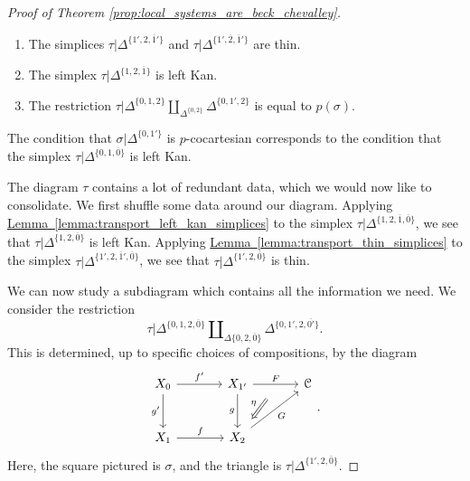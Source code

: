\documentclass[main.tex]{subfiles}
\begin{document}
\begin{proof}[Proof of Theorem \ref{prop:local_systems_are_beck_chevalley}]
\begin{enumerate}
    \item The simplices $\tau|\Delta^{\{1',2,\overline{1}'\}}$ and $\tau|\Delta^{\{1',\overline{2},\overline{1}'\}}$ are thin.

    \item The simplex $\tau|\Delta^{\{1,2,\overline{1}\}}$ is left Kan.

    \item The restriction $\tau|\Delta^{\{0,1,2\}} \amalg_{\Delta^{\{0,2\}}}\Delta^{\{0,1',2\}}$ is equal to $p(\sigma)$.
  \end{enumerate}
  The condition that $\sigma|\Delta^{\{0, 1'\}}$ is $p$-cocartesian corresponds to the condition that the simplex $\tau|\Delta^{\{0,1,\overline{0}\}}$ is left Kan.

  The diagram $\tau$ contains a lot of redundant data, which we would now like to consolidate. We first shuffle some data around our diagram. Applying \hyperref[lemma:transport_left_kan_simplices]{Lemma~\ref*{lemma:transport_left_kan_simplices}} to the simplex $\tau|\Delta^{\{1,2,\overline{1}, \overline{0}\}}$, we see that $\tau|\Delta^{\{1,2,\overline{0}\}}$ is left Kan. Applying \hyperref[lemma:transport_thin_simplices]{Lemma~\ref*{lemma:transport_thin_simplices}} to the simplex $\tau|\Delta^{\{1',2, \overline{1}', \overline{0}\}}$, we see that $\tau|\Delta^{\{1',2, \overline{0}\}}$ is thin.

  We can now study a subdiagram which contains all the information we need. We consider the restriction
  \begin{equation*}
    \tau|\Delta^{\{0,1,2,\overline{0}\}} \amalg_{\Delta\{0,2,\overline{0}\}} \Delta^{\{0,1',2,\overline{0'}\}}.
  \end{equation*}
  This is determined, up to specific choices of compositions, by the diagram
  \begin{equation*}
    \begin{tikzcd}[row sep=large, column sep=large]
      X_{0}
      \arrow[r, "f'"]
      \arrow[d, swap, "g'"]
      & X_{1'}
      \arrow[d, swap, "g"]
      \arrow[r, "F", ""{swap, name=M}]
      & \category{C}
      \\
      X_{1}
      \arrow[r, "f"]
      & X_{2}
      \arrow[ur, swap, "G"]
      \arrow[from=M, Rightarrow, shorten=2ex, swap, "\eta"]
    \end{tikzcd}.
  \end{equation*}
  Here, the square pictured is $\sigma$, and the triangle is $\tau|\Delta^{\{1',2,\overline{0}\}}$.


\end{proof}
\end{document}
